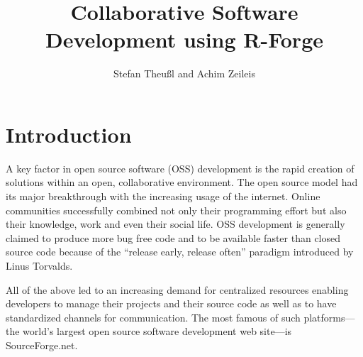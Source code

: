 \title{Collaborative Software Development using R-Forge}
\author{Stefan Theu\ss{}l and Achim Zeileis}

\maketitle



\section*{Introduction}




A key factor in open source software (OSS) development is the rapid creation
of solutions within an open, collaborative environment. The open
source model had its major breakthrough with the increasing
usage of the internet. Online communities successfully combined
not only their programming effort but also their knowledge, work
and even their social life. OSS development is generally
claimed to produce more bug free 
code and to be available faster than closed source code because of the
``release early, release often'' paradigm introduced by Linus
Torvalds.

All of the above led to an increasing demand for centralized resources
enabling developers to manage their projects and their source code as
well as to have standardized channels for communication. The most
famous of such platforms---the world's largest open source
software development web site---is SourceForge.net.

